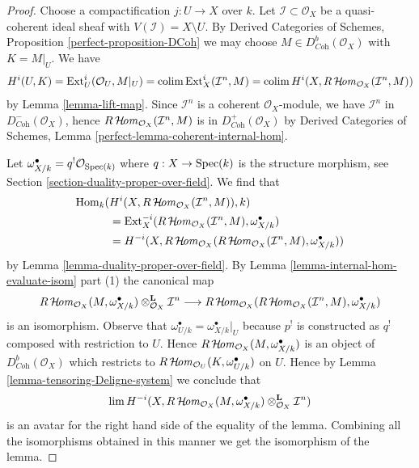 \begin{proof}
Choose a compactification $j : U \to X$ over $k$. Let
$\mathcal{I} \subset \mathcal{O}_X$ be a quasi-coherent ideal
sheaf with $V(\mathcal{I}) = X \setminus U$.
By Derived Categories of Schemes, Proposition \ref{perfect-proposition-DCoh}
we may choose $M \in D^b_{\textit{Coh}}(\mathcal{O}_X)$
with $K = M|_U$. We have
$$
H^i(U, K) =
\mathop{\mathrm{Ext}}\nolimits^i_U(\mathcal{O}_U, M|_U) =
\mathop{\mathrm{colim}}\nolimits \mathop{\mathrm{Ext}}\nolimits^i_X(\mathcal{I}^n, M) =
\mathop{\mathrm{colim}}\nolimits H^i(X, R\mathop{\mathcal{H}\!\mathit{om}}\nolimits_{\mathcal{O}_X}(\mathcal{I}^n, M))
$$
by Lemma \ref{lemma-lift-map}.
Since $\mathcal{I}^n$ is a coherent $\mathcal{O}_X$-module,
we have $\mathcal{I}^n$ in $D^-_{\textit{Coh}}(\mathcal{O}_X)$,
hence $R\mathop{\mathcal{H}\!\mathit{om}}\nolimits_{\mathcal{O}_X}(\mathcal{I}^n, M)$ is in
$D^+_{\textit{Coh}}(\mathcal{O}_X)$ by
Derived Categories of Schemes, Lemma
\ref{perfect-lemma-coherent-internal-hom}.

\medskip\noindent
Let $\omega_{X/k}^\bullet = q^!\mathcal{O}_{\mathop{\mathrm{Spec}}(k)}$ where
$q : X \to \mathop{\mathrm{Spec}}(k)$ is the structure morphism, see
Section \ref{section-duality-proper-over-field}. We find that
\begin{align*}
\mathop{\mathrm{Hom}}\nolimits_k(
&
H^i(X, R\mathop{\mathcal{H}\!\mathit{om}}\nolimits_{\mathcal{O}_X}(\mathcal{I}^n, M)), k) \\
& =
\mathop{\mathrm{Ext}}\nolimits^{-i}_X(R\mathop{\mathcal{H}\!\mathit{om}}\nolimits_{\mathcal{O}_X}(\mathcal{I}^n, M),
\omega_{X/k}^\bullet) \\
& =
H^{-i}(X, R\mathop{\mathcal{H}\!\mathit{om}}\nolimits_{\mathcal{O}_X}(R\mathop{\mathcal{H}\!\mathit{om}}\nolimits_{\mathcal{O}_X}(
\mathcal{I}^n, M), \omega_{X/k}^\bullet))
\end{align*}
by Lemma \ref{lemma-duality-proper-over-field}. By
Lemma \ref{lemma-internal-hom-evaluate-isom} part (1) the canonical map
$$
R\mathop{\mathcal{H}\!\mathit{om}}\nolimits_{\mathcal{O}_X}(M, \omega_{X/k}^\bullet)
\otimes_{\mathcal{O}_X}^\mathbf{L} \mathcal{I}^n
\longrightarrow
R\mathop{\mathcal{H}\!\mathit{om}}\nolimits_{\mathcal{O}_X}(R\mathop{\mathcal{H}\!\mathit{om}}\nolimits_{\mathcal{O}_X}(
\mathcal{I}^n, M), \omega_{X/k}^\bullet)
$$
is an isomorphism. Observe that
$\omega^\bullet_{U/k} = \omega^\bullet_{X/k}|_U$
because $p^!$ is constructed as $q^!$ composed with restriction to $U$.
Hence $R\mathop{\mathcal{H}\!\mathit{om}}\nolimits_{\mathcal{O}_X}(M, \omega_{X/k}^\bullet)$ is
an object of $D^b_{\textit{Coh}}(\mathcal{O}_X)$ which restricts
to $R\mathop{\mathcal{H}\!\mathit{om}}\nolimits_{\mathcal{O}_U}(K, \omega_{U/k}^\bullet)$ on $U$.
Hence by Lemma \ref{lemma-tensoring-Deligne-system} we conclude that
$$
\mathop{\mathrm{lim}}\nolimits H^{-i}(X, R\mathop{\mathcal{H}\!\mathit{om}}\nolimits_{\mathcal{O}_X}(M, \omega_{X/k}^\bullet)
\otimes_{\mathcal{O}_X}^\mathbf{L} \mathcal{I}^n)
$$
is an avatar for the right hand side of the equality of the lemma.
Combining all the isomorphisms obtained in this manner we get
the isomorphism of the lemma.
\end{proof}

